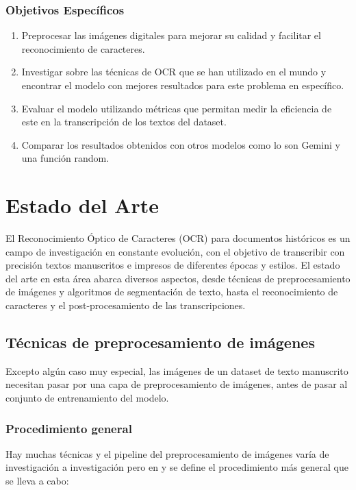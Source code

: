 \documentclass{article}
\begin{document}
\subsubsection{Objetivos Específicos}
\begin{enumerate}
    \item Preprocesar las imágenes digitales para mejorar su calidad y facilitar el reconocimiento de caracteres.
    \item Investigar sobre las técnicas de OCR que se han utilizado en el mundo y encontrar el modelo con mejores resultados para este problema en específico.
    \item Evaluar el modelo utilizando métricas que permitan medir la eficiencia de este en la transcripción de los textos del dataset.
    \item Comparar los resultados obtenidos con otros modelos como lo son Gemini y una función random.

    
\end{enumerate}

\newpage
\section{Estado del Arte}
El Reconocimiento Óptico de Caracteres (OCR) para documentos históricos es un campo de investigación en constante evolución, con el objetivo de transcribir con precisión textos manuscritos e impresos de diferentes épocas y estilos. El estado del arte en esta área abarca diversos aspectos, desde técnicas de preprocesamiento de imágenes y algoritmos de segmentación de texto, hasta el reconocimiento de caracteres y el post-procesamiento de las transcripciones.


\subsection{Técnicas de preprocesamiento de imágenes}

Excepto algún caso muy especial, las imágenes de un dataset de texto manuscrito necesitan pasar por una capa de preprocesamiento de imágenes, antes de pasar al conjunto de entrenamiento del modelo.

\subsubsection{Procedimiento general} 
Hay muchas técnicas y el pipeline del preprocesamiento de imágenes varía de investigación a investigación pero en \cite{1} y \cite{2} se define el procedimiento más general que se lleva a cabo:
\end{document}
